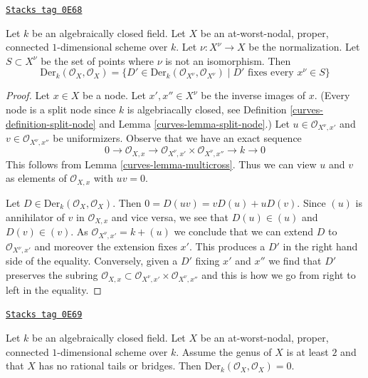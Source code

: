 \begin{lemma}
\label{curves-lemma-nodal-vector-fields}
\href{https://stacks.math.columbia.edu/tag/0E68}{\texttt{Stacks tag 0E68}}

Let $k$ be an algebraically closed field.
Let $X$ be an at-worst-nodal, proper, connected
$1$-dimensional scheme over $k$. Let $\nu : X^\nu \to X$ be the normalization.
Let $S \subset X^\nu$ be the set of points where $\nu$ is not an
isomorphism. Then
$$
\text{Der}_k(\mathcal{O}_X, \mathcal{O}_X) =
\{D' \in \text{Der}_k(\mathcal{O}_{X^\nu}, \mathcal{O}_{X^\nu}) \mid
D' \text{ fixes every }x^\nu \in S\}
$$
\end{lemma}

\begin{proof}

Let $x \in X$ be a node. Let $x', x'' \in X^\nu$ be the inverse images
of $x$. (Every node is a split node since $k$ is algebriacally closed, see
Definition \ref{curves-definition-split-node} and
Lemma \ref{curves-lemma-split-node}.)
Let $u \in \mathcal{O}_{X^\nu, x'}$ and $v \in \mathcal{O}_{X^\nu, x''}$
be uniformizers. Observe that we have an exact sequence
$$
0 \to \mathcal{O}_{X, x} \to
\mathcal{O}_{X^\nu, x'} \times \mathcal{O}_{X^\nu, x''} \to k \to 0
$$
This follows from Lemma \ref{curves-lemma-multicross}.
Thus we can view $u$ and $v$ as elements of $\mathcal{O}_{X, x}$
with $uv = 0$.

\medskip\noindent
Let $D \in \text{Der}_k(\mathcal{O}_X, \mathcal{O}_X)$. Then
$0 = D(uv) = vD(u) + uD(v)$. Since $(u)$ is annihilator of
$v$ in $\mathcal{O}_{X, x}$ and vice versa, we see that $D(u) \in (u)$ and
$D(v) \in (v)$. As $\mathcal{O}_{X^\nu, x'} = k + (u)$
we conclude that we can extend $D$ to $\mathcal{O}_{X^\nu, x'}$
and moreover the extension fixes $x'$. This produces a $D'$
in the right hand side of the equality. Conversely, given a
$D'$ fixing $x'$ and $x''$ we find that $D'$ preserves
the subring $\mathcal{O}_{X, x} \subset
\mathcal{O}_{X^\nu, x'} \times \mathcal{O}_{X^\nu, x''}$
and this is how we go from right to left in the equality.
\end{proof}

\begin{lemma}
\label{curves-lemma-stable-vector-fields}
\href{https://stacks.math.columbia.edu/tag/0E69}{\texttt{Stacks tag 0E69}}

Let $k$ be an algebraically closed field.
Let $X$ be an at-worst-nodal, proper, connected
$1$-dimensional scheme over $k$. Assume the genus of $X$ is at least
$2$ and that $X$ has no rational tails
or bridges. Then
$\text{Der}_k(\mathcal{O}_X, \mathcal{O}_X) = 0$.
\end{lemma}


